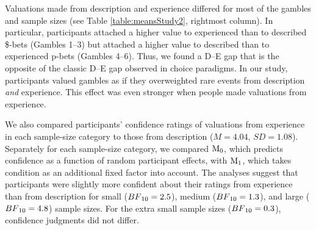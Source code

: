 \documentclass[a4paper, man, floatsintext]{apa6}
\begin{document}
Valuations made from description and experience differed for most of the
gambles and sample sizes (see Table \ref{table:meansStudy2}, rightmost
column). In particular, participants attached a higher value to
experienced than to described \$-bets (Gambles 1--3) but attached a
higher value to described than to experienced p-bets (Gambles 4--6).
Thus, we found a D--E gap that is the opposite of the classic D--E gap
observed in choice paradigms. In our study, participants valued gambles
as if they overweighted rare events from description \textit{and}
experience. This effect was even stronger when people made valuations
from experience.

We also compared participants' confidence ratings of valuations from
experience in each sample-size category to those from description
(\(M = 4.04\), \(SD = 1.08\)). Separately for each sample-size category,
we compared \(\mathrm{M}\textsubscript{0}\), which predicts confidence
as a function of random participant effects, with
\(\mathrm{M}\textsubscript{1}\), which takes condition as an additional
fixed factor into account. The analyses suggest that participants were
slightly more confident about their ratings from experience than from
description for small (\(BF\textsubscript{10} = 2.5\)), medium
(\(BF\textsubscript{10} = 1.3\)), and large
(\(BF\textsubscript{10} = 4.8\)) sample sizes. For the extra small
sample sizes (\(BF\textsubscript{10} = 0.3\)), confidence judgments did
not differ.
\end{document}
